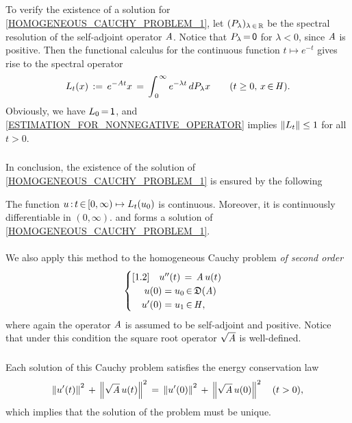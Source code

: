 \documentclass[11pt,twoside]{article}
\begin{document}
\subparagraph*{}
To verify the existence of a solution for \eqref{HOMOGENEOUS_CAUCHY_PROBLEM_1},
let $(P_{\lambda})_{\lambda {\,\in\,} {\mathbb{R}}}$ be the spectral resolution
of the self-adjoint operator $\mathit{A}$.
Notice that $P_{\lambda} {\,=\,} {\mathsf{0}}$ for $\lambda < 0$,
since $\mathit{A}$ is positive.
Then the functional calculus for the continuous function $t \mapsto e^{-t}$
gives rise to the spectral operator
\begin{equation}\label{SPECTRAL_OPERATOR_I}
{L}_t(x)
\,:=\,
e^{-\mathit{A} t} x
\,=\,
\int_{\,0}^{\,\infty} e^{-\lambda t} \, dP_{\lambda} x
\quad \quad (t \geq 0, \, x {\,\in\,} \mathit{H}).
\end{equation}
Obviously,
we have ${L}_0 {\,=\,} {\mathsf{1}}$,
and \eqref{ESTIMATION_FOR_NONNEGATIVE_OPERATOR} implies
$\left\lVert {L}_t \right\rVert \leq 1$ for all $t > 0$.

\subparagraph*{}
In conclusion,
the existence of the solution of \eqref{HOMOGENEOUS_CAUCHY_PROBLEM_1}
is ensured by the following

\begin{theorem}\label{EXISTENCE_THEOREM_FOR_ABSTRACT_HEAT_EQUATION}
The function $u{\,:\,}t {\,\in\,} [0,\infty) \mapsto {L}_t(u_0)$ is continuous.
Moreover,
it is continuously differentiable in $(0,\infty)$.
and forms a solution of \eqref{HOMOGENEOUS_CAUCHY_PROBLEM_1}.
\end{theorem}

%

\paragraph*{}
We also apply this method to the homogeneous Cauchy problem
\textit{of second order}
\begin{equation}\label{HOMOGENEOUS_CAUCHY_PROBLEM_2}
\begin{cases}[1.2]
\quad u''(t) \,=\, \mathit{A} \, u(t) \\
\quad \; u(0)  = u_0 {\,\in\,} \mathfrak{D}(\mathit{A}) \\
\quad    u'(0) = u_1 {\,\in\,} \mathit{H},\\
\end{cases}
\end{equation}
where again the operator $\mathit{A}$ is assumed to be self-adjoint and positive.
Notice that under this condition
the square root operator $\sqrt{\mathit{A}}$ is well-defined.

\subparagraph*{}
Each solution of this Cauchy problem satisfies the energy conservation law
\[
\left\lVert u'(t) \right\rVert^2 \, + \, \left\lVert \sqrt{\mathit{A}} \, u(t) \right\rVert^2
\,=\,
\left\lVert u'(0) \right\rVert^2 \, + \, \left\lVert \sqrt{\mathit{A}} \, u(0) \right\rVert^2
\quad (t > 0),
\]
which implies
that the solution of the problem must be unique.
\end{document}

